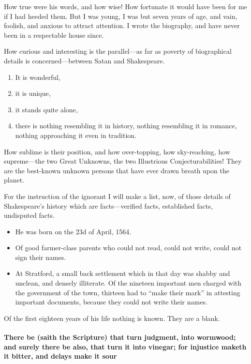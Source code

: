\documentclass[a4paper, 12pt]{memoir}
\begin{document}
How true were his words, and how wise!  How fortunate it would have been for me if I had heeded them.  But I was young, I was but seven years of age, and vain, foolish, and anxious to attract attention.  I wrote the biography, and have never been in a respectable house since.


How curious and interesting is the parallel—as far as poverty of biographical details is concerned—between Satan and Shakespeare.
\begin{enumerate}
 \item   It is wonderful,
 \item   it is unique, 
 \item    it stands quite alone,
 \item   there is nothing resembling it in history, nothing resembling it in romance, nothing approaching it even in tradition.
\end{enumerate}
 How sublime is their position, and how over-topping, how sky-reaching, how supreme—the two Great Unknowns, the two Illustrious Conjecturabilities!  They are the best-known unknown persons that have ever drawn breath upon the planet.



For the instruction of the ignorant I will make a list, now, of those details of Shakespeare’s history which are facts—verified facts, established facts, undisputed facts.

\tightlists 

\begin{itemize}[•\textbullet ] 
\item He was born on the 23d of April, 1564.
\item  
Of good farmer-class parents who could not read, could not write, could not sign their names.
\item  At Stratford, a small back settlement which in that day was shabby and unclean, and densely illiterate.  Of the nineteen important men charged with the government of the town, thirteen had to “make their mark” in attesting important documents, because they could not write their names.
\end{itemize}



Of the first eighteen years of his life nothing is known.  They are a blank.


\paragraph*{ There be (saith the Scripture) that turn judgment, into wormwood; and surely there be also, that turn it into vinegar; for injustice maketh it bitter, and delays make it sour }
\end{document}
